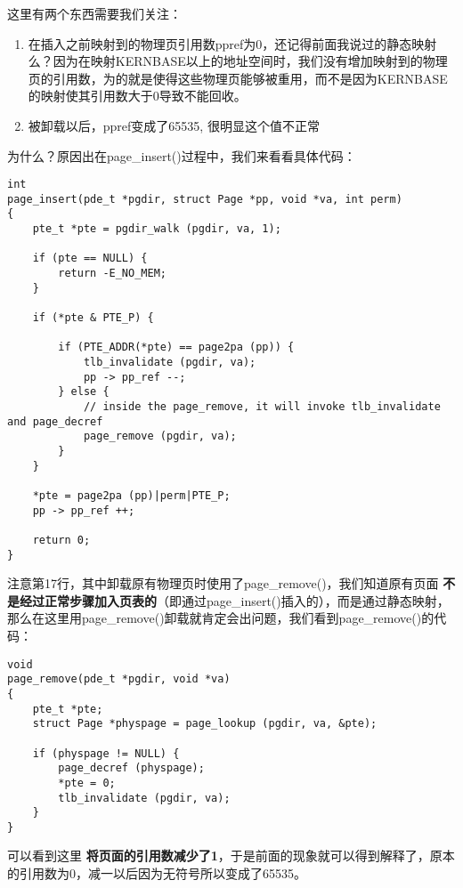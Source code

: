 \documentclass{article}
\newcommand{\highlight}[1]{{\bfseries \color{red}  #1}}
\newcommand{\funcname}[1]{{\ttfamily \small #1}}
\begin{document}
\begin{CJK*}{UTF8}{gkai}
这里有两个东西需要我们关注：

\begin{enumerate}
\item{在插入之前映射到的物理页引用数ppref为0，还记得前面我说过的静态映射么？因为在映射KERNBASE以上的地址空间时，我们没有增加映射到的物理页的引用数，为的就是使得这些物理页能够被重用，而不是因为KERNBASE的映射使其引用数大于0导致不能回收。}
\item{被卸载以后，ppref变成了65535, 很明显这个值不正常}
\end{enumerate}

为什么？原因出在\funcname{page\_insert()}过程中，我们来看看具体代码：


\begin{lstlisting}[style=ccode, title={\scriptsize \ttfamily \bfseries kern/pmap.c: page\_insert()}]
int
page_insert(pde_t *pgdir, struct Page *pp, void *va, int perm) 
{
    pte_t *pte = pgdir_walk (pgdir, va, 1);

    if (pte == NULL) {
        return -E_NO_MEM;
    }

    if (*pte & PTE_P) {

        if (PTE_ADDR(*pte) == page2pa (pp)) {
            tlb_invalidate (pgdir, va);
            pp -> pp_ref --;
        } else {
            // inside the page_remove, it will invoke tlb_invalidate and page_decref
            page_remove (pgdir, va);
        }
    }
    
    *pte = page2pa (pp)|perm|PTE_P;
    pp -> pp_ref ++;

    return 0;
}
\end{lstlisting}

注意第17行，其中卸载原有物理页时使用了\funcname{page\_remove()}，我们知道原有页面\highlight{不是经过正常步骤加入页表的}（即通过\funcname{page\_insert()}插入的），而是通过静态映射，那么在这里用\funcname{page\_remove()}卸载就肯定会出问题，我们看到\funcname{page\_remove()}的代码：

\begin{lstlisting}[style=ccode, title={\scriptsize \ttfamily \bfseries kern/pmap.c: page\_remove()}]
void
page_remove(pde_t *pgdir, void *va)
{
    pte_t *pte;
    struct Page *physpage = page_lookup (pgdir, va, &pte);

    if (physpage != NULL) {
        page_decref (physpage);
        *pte = 0;
        tlb_invalidate (pgdir, va);
    }
}
\end{lstlisting}

可以看到这里\highlight{将页面的引用数减少了1}，于是前面的现象就可以得到解释了，原本的引用数为0，减一以后因为无符号所以变成了65535。


\end{CJK*}
\end{document}
